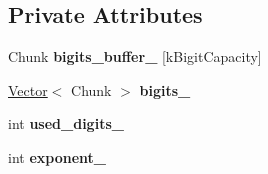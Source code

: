 \subsection*{Private Attributes}
\begin{DoxyCompactItemize}
\item 
Chunk {\bfseries bigits\+\_\+buffer\+\_\+} \mbox{[}k\+Bigit\+Capacity\mbox{]}\hypertarget{classv8_1_1internal_1_1_bignum_a15af73b34c37364072d3b8a9f76cf412}{}\label{classv8_1_1internal_1_1_bignum_a15af73b34c37364072d3b8a9f76cf412}

\item 
\hyperlink{classv8_1_1internal_1_1_vector}{Vector}$<$ Chunk $>$ {\bfseries bigits\+\_\+}\hypertarget{classv8_1_1internal_1_1_bignum_ab7ea1add01e1ee1c0600f07bdc532d80}{}\label{classv8_1_1internal_1_1_bignum_ab7ea1add01e1ee1c0600f07bdc532d80}

\item 
int {\bfseries used\+\_\+digits\+\_\+}\hypertarget{classv8_1_1internal_1_1_bignum_a699aca8f349c0bfebffe8ca068e2bbd4}{}\label{classv8_1_1internal_1_1_bignum_a699aca8f349c0bfebffe8ca068e2bbd4}

\item 
int {\bfseries exponent\+\_\+}\hypertarget{classv8_1_1internal_1_1_bignum_a9884ef5674283dbf82d5a3671d556ed2}{}\label{classv8_1_1internal_1_1_bignum_a9884ef5674283dbf82d5a3671d556ed2}

\end{DoxyCompactItemize}
